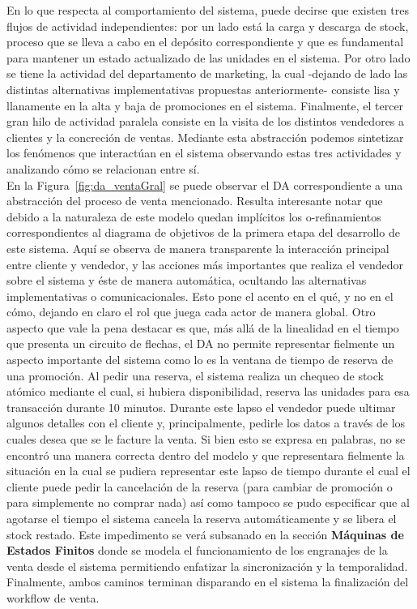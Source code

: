 En lo que respecta al comportamiento del sistema, puede decirse que existen tres flujos de actividad independientes: por un lado está la carga y descarga de stock, proceso que se lleva a cabo en el depósito correspondiente y que es fundamental para mantener un estado actualizado de las unidades en el sistema. Por otro lado se tiene la actividad del departamento de marketing, la cual -dejando de lado las distintas alternativas implementativas propuestas anteriormente- consiste lisa y llanamente en la alta y baja de promociones en el sistema. Finalmente, el tercer gran hilo de actividad paralela consiste en la visita de los distintos vendedores a clientes y la concreción de ventas. Mediante esta abstracción podemos sintetizar los fenómenos que interactúan en el sistema observando estas tres actividades y analizando cómo se relacionan entre sí.\\
\indent En la Figura~\ref{fig:da_ventaGral} se puede observar el DA correspondiente a una abstracción del proceso de venta mencionado. Resulta interesante notar que debido a la naturaleza de este modelo quedan implícitos los o-refinamientos correspondientes al diagrama de objetivos de la primera etapa del desarrollo de este sistema. Aquí se observa de manera transparente la interacción principal entre cliente y vendedor, y las acciones más importantes que realiza el vendedor sobre el sistema y éste de manera automática, ocultando las alternativas implementativas o comunicacionales. Esto pone el acento en el qué, y no en el cómo, dejando en claro el rol que juega cada actor de manera global. Otro aspecto que vale la pena destacar es que, más allá de la linealidad en el tiempo que presenta un circuito de flechas, el DA no permite representar fielmente un aspecto importante del sistema como lo es la ventana de tiempo de reserva de una promoción. Al pedir una reserva, el sistema realiza un chequeo de stock atómico mediante el cual, si hubiera disponibilidad, reserva las unidades para esa transacción durante 10 minutos. Durante este lapso el vendedor puede ultimar algunos detalles con el cliente y, principalmente, pedirle los datos a través de los cuales desea que se le facture la venta. Si bien esto se expresa en palabras, no se encontró una manera correcta dentro del modelo y que representara fielmente la situación en la cual se pudiera representar este lapso de tiempo durante el cual el cliente puede pedir la cancelación de la reserva (para cambiar de promoción o para simplemente no comprar nada) así como tampoco se pudo especificar que al agotarse el tiempo el sistema cancela la reserva automáticamente y se libera el stock restado. Este impedimento se verá subsanado en la sección \textbf{Máquinas de Estados Finitos} donde se modela el funcionamiento de los engranajes de la venta desde el sistema permitiendo enfatizar la sincronización y la temporalidad. Finalmente, ambos caminos terminan disparando en el sistema la finalización del workflow de venta.\\
